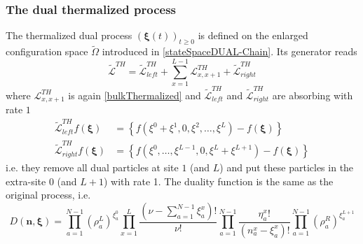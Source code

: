 \documentclass[10pt]{article}
\numberwithin{equation}{section}
\numberwithin{equation}{subsection}
\begin{document}
\subsubsection{The dual thermalized process}
The thermalized dual process $(\bm{\xi}(t))_{t\geq 0}$ is defined on the enlarged configuration space $\widetilde{\Omega}$ introduced in \eqref{stateSpaceDUAL-Chain}. Its generator reads
\begin{equation}
		\widetilde{\mathcal{L}}^{TH}=\widetilde{\mathcal{L}}_{left}^{TH}+\sum_{x=1}^{L-1}\mathcal{L}_{x,x+1}^{TH}+\widetilde{\mathcal{L}}_{right}^{TH}
\end{equation}
where $\mathcal{L}^{TH}_{x,x+1}$ is again \eqref{bulkThermalized} and $\widetilde{\mathcal{L}}_{left}^{TH}$ and $\widetilde{\mathcal{L}}_{right}^{TH}$ are absorbing with rate $1$
\begin{align}
		\widetilde{\mathcal{L}}_{left}^{TH}f(\bm{\xi})&=\left\{f(\xi^{0}+\xi^{1},0,\xi^{2},\ldots,\xi^{L})-f(\bm{\xi})\right\}\nonumber\\ \widetilde{\mathcal{L}}_{right}^{TH}f(\bm{\xi})&=\left\{f(\xi^{0},\ldots,\xi^{L-1},0,\xi^{L}+\xi^{L+1})-f(\bm{\xi})\right\}
	\end{align}
i.e. they remove all dual particles at site $1$ (and $L$) and put these particles in the extra-site $0$ (and $L+1$) with rate 1. 
The duality function is the same as the original process, i.e.
\begin{equation}
	D(\bm{n},\bm{\xi})=\prod_{a=1}^{N-1}\left(\rho_{a}^{L}\right)^{\xi_{a}^{0}}\prod_{x=1}^{L}\frac{(\nu-\sum_{a=1}^{N-1}\xi_{a}^{x})!}{\nu!}\prod_{a=1}^{N-1}\frac{\eta_{a}^{x}!}{(n_{a}^{x}-\xi_{a}^{x})!}\prod_{a=1}^{N-1}\left(\rho_{a}^{R}\right)^{\xi_{a}^{L+1}}
\end{equation}
\end{document}
